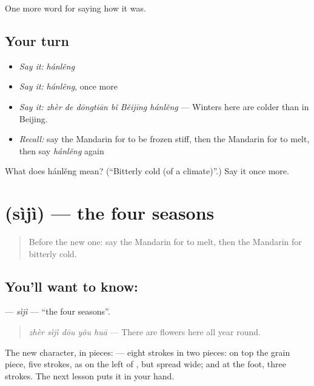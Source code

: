 \begin{grammarlens}[title={What you've built}]
One more word for saying how it was.
\end{grammarlens}

\subsection*{Your turn}
\begin{itemize}
\raggedright
  \item \emph{Say it:} \emph{hánlěng}
  \item \emph{Say it:} \emph{hánlěng}, once more
  \item \emph{Say it:} \emph{zhèr de dōngtiān bǐ Běijīng hánlěng} — Winters here are colder than in Beijing.
  \item \emph{Recall:} say the Mandarin for to be frozen stiff, then the Mandarin for to melt, then say \emph{hánlěng} again
\end{itemize}

\begin{tcolorbox}[breakable,colback=teal!4,colframe=teal!35!black,title={Before you move on}]
What does hánlěng mean? (\textquotedblleft{}Bitterly cold (of a climate)\textquotedblright{}.) Say it once more.
\end{tcolorbox}
\section[\texorpdfstring{\zh{四季} (sìjì)}{四季 (sìjì)}]{ (sìjì) — the four seasons}

\label{lesson:ZH-C515-siji}



\begin{quote}
Before the new one: say the Mandarin for to melt, then the Mandarin for bitterly cold.
\end{quote}

\subsection*{You'll want to know: }
\textbf{} — \emph{sìjì} — \textquotedblleft{}the four seasons\textquotedblright{}.

\begin{quote}
\textbf{} \emph{zhèr sìjì dōu yǒu huā} — There are flowers here all year round.
\end{quote}

The new character, in pieces:  — eight strokes in two pieces: on top the grain piece, five strokes, as on the left of , but spread wide; and  at the foot, three strokes. The next lesson puts it in your hand.

